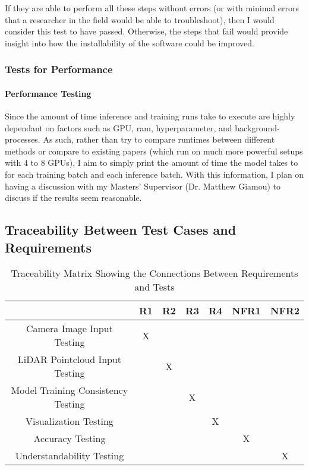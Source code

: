 \documentclass[12pt, titlepage]{article}
\begin{document}
If they are able to perform all these steps without errors (or with minimal errors that a researcher in the field would be able to troubleshoot),
then I would consider this test to have passed. Otherwise, the steps that fail would provide insight into how the installability of the software could be improved.

\subsubsection{Tests for Performance}

\paragraph{Performance Testing}

Since the amount of time inference and training runs take to execute are highly dependant on factors such as GPU, ram, hyperparameter, and background-processes.
As such, rather than try to compare runtimes between different methods or compare to existing papers (which run on much more powerful setups with 4 to 8 GPUs), I aim
to simply print the amount of time the model takes to for each training batch and each inference batch. With this information, I plan on having a discussion with my Masters' 
Supervisor (Dr. Matthew Giamou) to discuss if the results seem reasonable.

\subsection{Traceability Between Test Cases and Requirements}

\begin{table}[h!]
  \centering
  \begin{tabular}{|c|c|c|c|c|c|c|}
  \hline
    & R1 & R2 & R3 & R4 & NFR1 & NFR2 \\
  \hline
  Camera Image Input Testing             &X& & & & & \\ \hline
  LiDAR Pointcloud Input Testing         & &X& & & & \\ \hline
  Model Training Consistency Testing     & & &X& & & \\ \hline
  Visualization Testing                  & & & &X& & \\ \hline
  Accuracy Testing                       & & & & &X& \\ \hline
  Understandability Testing              & & & & & &X\\ \hline
  \hline
  \end{tabular}
  \caption{Traceability Matrix Showing the Connections Between Requirements and Tests}
  \label{Table:R_trace}
  \end{table}
\end{document}
